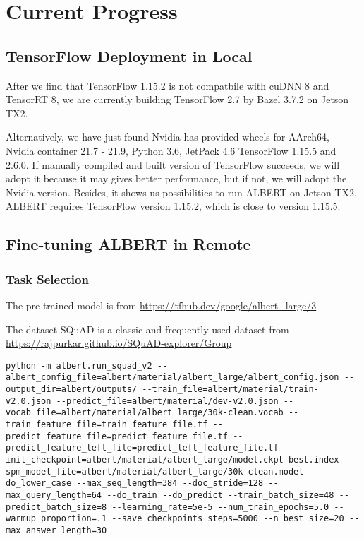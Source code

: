 \documentclass[a4paper]{article}
\begin{document}
\section{Current Progress}
\subsection{TensorFlow Deployment in Local}
After we find that TensorFlow 1.15.2 is not compatbile with cuDNN 8 and TensorRT 8, we are currently building TensorFlow 2.7 by Bazel 3.7.2 on Jetson TX2.

Alternatively, we have just found Nvidia has provided wheels for AArch64, Nvidia container 21.7 - 21.9, Python 3.6, JetPack 4.6 TensorFlow 1.15.5 and 2.6.0. If manually compiled and built version of TensorFlow succeeds, we will adopt it because it may gives better performance, but if not, we will adopt the Nvidia version. Besides, it shows us possibilities to run ALBERT on Jetson TX2. ALBERT requires TensorFlow version 1.15.2, which is close to version 1.15.5.

\subsection{Fine-tuning ALBERT in Remote}
\subsubsection{Task Selection}
The pre-trained model is  from \url{https://tfhub.dev/google/albert_large/3}

The dataset SQuAD is a classic and frequently-used dataset from \url{https://rajpurkar.github.io/SQuAD-explorer/Group}
\begin{verbatim}
python -m albert.run_squad_v2 --albert_config_file=albert/material/albert_large/albert_config.json --output_dir=albert/outputs/ --train_file=albert/material/train-v2.0.json --predict_file=albert/material/dev-v2.0.json --vocab_file=albert/material/albert_large/30k-clean.vocab --train_feature_file=train_feature_file.tf --predict_feature_file=predict_feature_file.tf --predict_feature_left_file=predict_left_feature_file.tf --init_checkpoint=albert/material/albert_large/model.ckpt-best.index --spm_model_file=albert/material/albert_large/30k-clean.model --do_lower_case --max_seq_length=384 --doc_stride=128 --max_query_length=64 --do_train --do_predict --train_batch_size=48 --predict_batch_size=8 --learning_rate=5e-5 --num_train_epochs=5.0 --warmup_proportion=.1 --save_checkpoints_steps=5000 --n_best_size=20 --max_answer_length=30
\end{verbatim}
\end{document}
